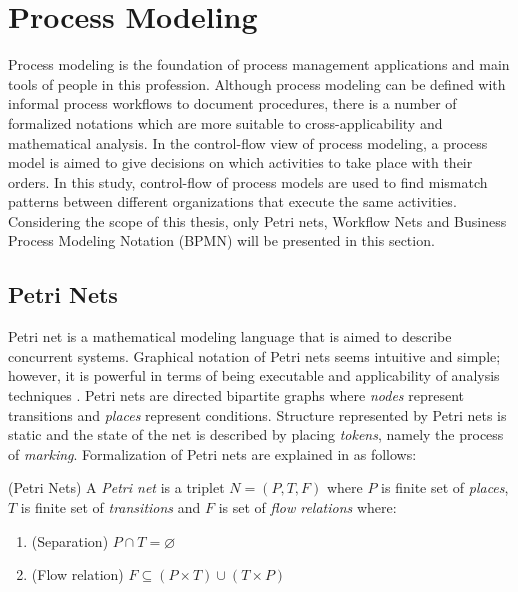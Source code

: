 \section{Process Modeling}
\label{sec:process-modeling}
Process modeling is the foundation of process management applications and main tools of people in this profession. Although process modeling can be defined with informal process workflows to document procedures, there is a number of formalized notations which are more suitable to cross-applicability and mathematical analysis. In the control-flow view of process modeling, a process model is aimed to give decisions on which activities to take place with their orders. In this study, control-flow of process models are used to find mismatch patterns between different organizations that execute the same activities. Considering the scope of this  thesis, only Petri nets, Workflow Nets and Business Process Modeling Notation (BPMN) will be presented in this section. 

\subsection{Petri Nets}
\label{sec:petri-nets}
Petri net is a mathematical modeling language that is aimed to describe concurrent systems. Graphical notation of Petri nets seems intuitive and simple; however, it is powerful in terms of being executable and applicability of analysis techniques \cite{vanderAalst:2011:MBP:2000715}. Petri nets are directed bipartite graphs where \textit{nodes} represent transitions and \textit{places} represent conditions. Structure represented by Petri nets is static and the state of the net is described by placing \textit{tokens}, namely the process of \textit{marking}. Formalization of Petri nets are explained in \cite{reisig1998lectures} as follows:
\theoremstyle{definition}
\begin{definition}{}
(Petri Nets) A \textit{Petri net} is a triplet $N = (P, T, F)$ where $P$ is finite set of \textit{places}, $T$ is finite set of \textit{transitions} and $F$ is set of \textit{flow relations} where:
\begin{enumerate}
  \item (Separation) $P \cap T = \varnothing$
  \item (Flow relation) $F \subseteq (P \times T) \cup (T \times P)$
\end{enumerate}
\end{definition}

